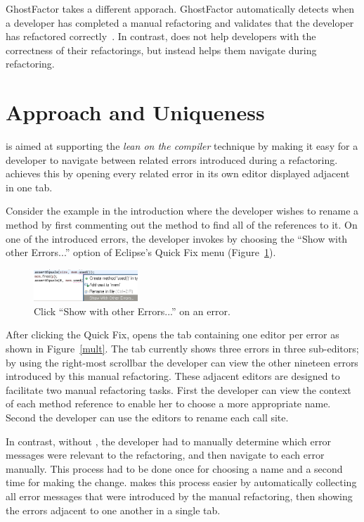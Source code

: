 \documentclass{sigplanconf}
\begin{document}
GhostFactor takes a different apporach. GhostFactor automatically detects
when a developer has completed a manual refactoring and validates
that the developer has refactored correctly~\cite{ghost-factor}.
In contrast, \pname{} does not help developers with the correctness of
their refactorings, but instead helps them navigate during refactoring.

\section{Approach and Uniqueness}
\pname{} is aimed at supporting the \textit{lean on the compiler} technique
by making it easy for a developer to navigate between related errors introduced
during a refactoring. \pname{} achieves this by opening every related error
in its own editor displayed adjacent in one tab.

Consider the example in the introduction where the developer
wishes to rename a method by first commenting out
the method to find all of the references to it.
On one of the introduced errors, the developer invokes \pname{} by choosing
the ``Show with other Errors...'' option of Eclipse's Quick Fix
menu (Figure~\ref{quick}).

\begin{figure}[h]
\begin{center}
\includegraphics[width=0.35\textwidth]{quick-fix.png}
\caption{Click ``Show with other Errors...'' on an error.\label{quick}}
\end{center}
\end{figure}

After clicking the Quick Fix, \pname{} opens the tab containing one editor
per error as shown in Figure~\ref{mult}. The tab currently shows three
errors in three sub-editors; by using the right-most scrollbar the developer
can view the other nineteen errors introduced by this manual refactoring.
These adjacent editors are designed to facilitate two manual refactoring tasks.
First the developer can view the context of each method reference to enable
her to choose a more appropriate name. Second the developer can use
the editors to rename each call site.

In contrast, without \pname{}, the developer had to
manually determine which error messages were relevant to the refactoring, and
then navigate to each error manually. This process had to be done once for
choosing a name and a second time for making the change. \pname{} makes this
process
easier by automatically collecting all error messages that were introduced by
the manual refactoring, then showing the errors adjacent to one another in a
single tab.
\end{document}
